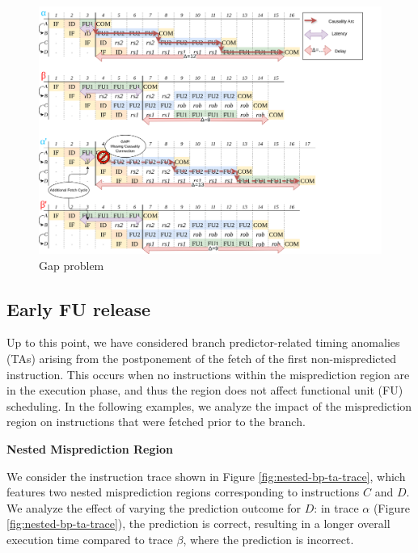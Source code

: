 \begin{figure}[H]
    \centering
    \includegraphics[width=\textwidth]{figures/gap-problem.png}
    \caption{Gap problem}
    \label{fig:gap-problem}
\end{figure}


\subsection{Early FU release}

Up to this point, we have considered branch predictor-related timing anomalies (TAs) arising from the postponement of the fetch of the first non-mispredicted instruction. This occurs when no instructions within the misprediction region are in the execution phase, and thus the region does not affect functional unit (FU) scheduling. In the following examples, we analyze the impact of the misprediction region on instructions that were fetched prior to the branch.

\begin{example}
\textbf{Nested Misprediction Region}

We consider the instruction trace shown in Figure \ref{fig:nested-bp-ta-trace}, which features two nested misprediction regions corresponding to instructions $C$ and $D$. We analyze the effect of varying the prediction outcome for $D$: in trace $\alpha$ (Figure \ref{fig:nested-bp-ta-trace}), the prediction is correct, resulting in a longer overall execution time compared to trace $\beta$, where the prediction is incorrect.
    
\label{ex:nested-bp-ta}
\end{example}


